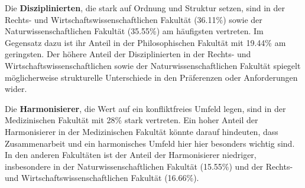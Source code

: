 \documentclass[german,report]{i1thesis}
\begin{document}
\begin{table}[H]
\centering
{}
\caption{Vergleich der Limbic Types nach Fakultäten}
\end{table}

Die \textbf{Disziplinierten}, die stark auf Ordnung und Struktur setzen, sind in der Rechts- und Wirtschaftswissenschaftlichen Fakultät (36.11\%) sowie der Naturwissenschaftlichen Fakultät (35.55\%) am häufigsten vertreten. Im Gegensatz dazu ist ihr Anteil in der Philosophischen Fakultät mit 19.44\% am geringsten. Der höhere Anteil der Disziplinierten in der Rechts- und Wirtschaftswissenschaftlichen sowie der Naturwissenschaftlichen Fakultät spiegelt möglicherweise strukturelle Unterschiede in den Präferenzen oder Anforderungen wider.

Die \textbf{Harmonisierer}, die Wert auf ein konfliktfreies Umfeld legen, sind in der Medizinischen Fakultät mit 28\% stark vertreten. Ein hoher Anteil der Harmonisierer in der Medizinischen Fakultät könnte darauf hindeuten, dass Zusammenarbeit und ein harmonisches Umfeld hier hier besonders wichtig sind. In den anderen Fakultäten ist der Anteil der Harmonisierer niedriger, insbesondere in der Naturwissenschaftlichen Fakultät (15.55\%) und der Rechts- und Wirtschaftswissenschaftlichen Fakultät (16.66\%).
\end{document}
